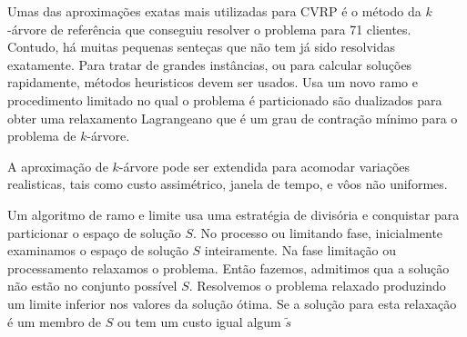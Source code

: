 \documentclass[a4paer, 12pt]{article}
\begin{document}
 Umas das aproximações exatas mais utilizadas para CVRP é o método da $k$-árvore de {\color{red}
referência} que conseguiu resolver o problema para 71 clientes. Contudo, há muitas pequenas senteças
que não tem já sido resolvidas exatamente. Para tratar de grandes instâncias, ou para calcular
soluções rapidamente, métodos heuristicos devem ser usados. Usa um novo ramo e procedimento
limitado no qual o problema é particionado são dualizados para obter uma relaxamento Lagrangeano que
é um grau de contração mínimo para o problema de $k$-árvore.

 A aproximação de $k$-árvore pode ser extendida para acomodar variações realisticas, tais como custo
assimétrico, janela de tempo, e vôos não uniformes.

 Um algoritmo de ramo e limite usa uma estratégia de divisória e conquistar para particionar o
espaço de solução $S$. No processo ou limitando fase, inicialmente examinamos o espaço de solução
$S$ inteiramente. Na fase limitação ou processamento relaxamos o problema. Então fazemos, admitimos
qua a solução não estão no conjunto possível $S$. Resolvemos o problema relaxado produzindo um
limite inferior nos valores da solução ótima. Se a solução para esta relaxação é um membro de $S$ ou
tem um custo igual algum $\tilde{s}$
\end{document}
